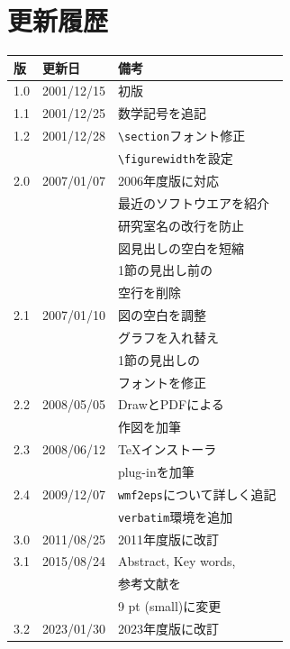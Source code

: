 \documentclass[twocolumn]{jsarticle}
\begin{document}
\appendix
\section{更新履歴}
\begin{tabular}[t]{|l|l|l|} \hline
  版 & 更新日 & 備考 \\ \hline \hline
  1.0 & 2001/12/15 & 初版 \\ \hline
  1.1 & 2001/12/25 & 数学記号を追記 \\ \hline
  1.2 & 2001/12/28 & \verb+\section+フォント修正 \\
  & & \verb+\figurewidth+を設定 \\ \hline\hline
  2.0 & 2007/01/07 & 2006年度版に対応 \\
  & & 最近のソフトウエアを紹介 \\
  & & 研究室名の改行を防止 \\
  & & 図見出しの空白を短縮 \\
  & & 1節の見出し前の \\
  & & 空行を削除 \\ \hline
  2.1 & 2007/01/10 & 図の空白を調整 \\
  & & グラフを入れ替え \\
  & & 1節の見出しの \\
  & & フォントを修正 \\ \hline
  2.2 & 2008/05/05 & DrawとPDFによる \\
  & & 作図を加筆 \\ \hline
  2.3 & 2008/06/12 & \TeX インストーラ \\
  & & plug-inを加筆 \\ \hline
  2.4 & 2009/12/07 & \verb+wmf2eps+について詳しく追記 \\
  & & \verb+verbatim+環境を追加 \\ \hline\hline
  3.0 & 2011/08/25 & 2011年度版に改訂 \\ \hline
  3.1 & 2015/08/24 & Abstract, Key words, \\
  & & 参考文献を\\
  & & 9 pt (small)に変更 \\ \hline
  3.2 & 2023/01/30 & 2023年度版に改訂 \\ \hline
\end{tabular}
\end{document}
